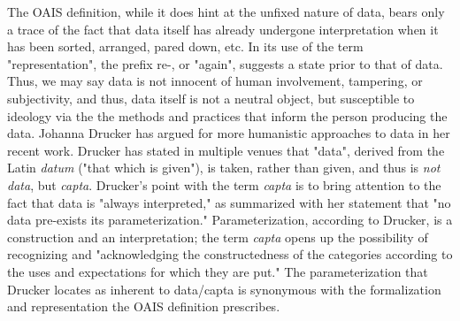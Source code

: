 The OAIS definition, while it does hint at the unfixed nature of data, bears only a trace of the fact that data itself has already undergone interpretation when it has been sorted, arranged, pared down, etc. In its use of the term "representation", the prefix re-, or "again", suggests a state prior to that of data. Thus, we may say data is not innocent of human involvement, tampering, or subjectivity, and thus, data itself is not a neutral object, but susceptible to ideology via the the methods and practices that inform the person producing the data. Johanna Drucker has argued for more humanistic approaches to data in her recent work. Drucker has stated in multiple venues that "data", derived from the Latin \textit{datum} ("that which is given"), is taken, rather than given, and thus is \textit{not} \textit{data}, but \textit{capta}.\autocites[128-9]{drucker_graphesis_2014}[3]{drucker_humanities_2011} Drucker's point with the term \textit{capta} is to bring attention to the fact that data is "always interpreted," as summarized with her statement that "no data pre-exists its parameterization."\autocite[129]{drucker_graphesis_2014} Parameterization, according to Drucker, is a construction and an interpretation; the term \textit{capta} opens up the possibility of recognizing and "acknowledging the constructedness of the categories according to the uses and expectations for which they are put."\autocite[129]{drucker_graphesis_2014}  The parameterization that Drucker locates as inherent to data/capta is synonymous with the formalization and representation the OAIS definition prescribes. 

